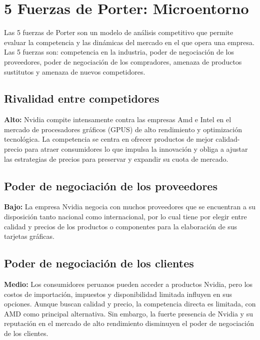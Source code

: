 \documentclass{article}
\begin{document}
\section{5 Fuerzas de Porter: Microentorno}

Las 5 fuerzas de Porter son un modelo de análisis competitivo que permite evaluar la competencia y las dinámicas del mercado en el que opera una empresa. Las 5 fuerzas son: competencia en la industria, poder de negociación de los proveedores, poder de negociación de los compradores, amenaza de productos sustitutos y amenaza de nuevos competidores.

\subsection{Rivalidad entre competidores}

\textbf{\large{Alto:}} Nvidia compite intensamente contra las empresas Amd e Intel en el mercado
de procesadores gráficos (GPUS) de alto rendimiento y optimización tecnológica. La
competencia se centra en ofrecer productos de mejor calidad-precio para atraer
consumidores lo que impulsa la innovación y obliga a ajustar las estrategias de
precios para preservar y expandir su cuota de mercado.

\subsection{Poder de negociación de los proveedores}

\textbf{\large{Bajo:}} La empresa Nvidia negocia con muchos proveedores que se encuentran a su
disposición tanto nacional como internacional, por lo cual tiene por elegir entre
calidad y precios de los productos o componentes para la elaboración de sus
tarjetas gráficas.

\subsection{Poder de negociación de los clientes}

\textbf{\large{Medio:}} Los consumidores peruanos pueden acceder a productos Nvidia, pero
los costos de importación, impuestos y disponibilidad limitada influyen en sus
opciones. Aunque buscan calidad y precio, la competencia directa es
limitada, con AMD como principal alternativa. Sin embargo,
la fuerte
presencia de Nvidia y su reputación en el mercado de alto rendimiento
disminuyen el poder de negociación de los clientes.
\end{document}
